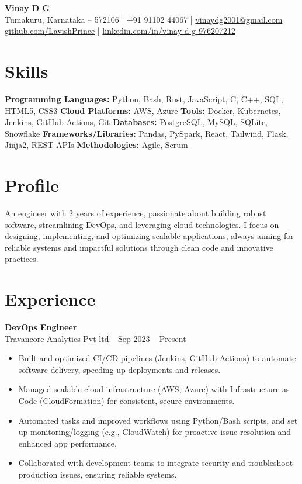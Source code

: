 \documentclass[a4paper,9pt]{article}
\begin{document}
\textbf{\Large Vinay D G} \\Tumakuru, Karnataka – 572106 \quad | \quad +91 91102 44067 \quad | \quad \href{mailto:vinaydg2001@gmail.com}{vinaydg2001@gmail.com} \\\href{https://github.com/LavishPrince}{github.com/LavishPrince} \quad | \quad \href{https://www.linkedin.com/in/vinay-d-g-976207212/}{linkedin.com/in/vinay-d-g-976207212}

\section*{Skills}
\textbf{Programming Languages:} Python, Bash, Rust, JavaScript, C, C++, SQL, HTML5, CSS3
\textbf{Cloud Platforms:} AWS, Azure
\textbf{Tools:} Docker, Kubernetes, Jenkins, GitHub Actions, Git
\textbf{Databases:} PostgreSQL, MySQL, SQLite, Snowflake
\textbf{Frameworks/Libraries:} Pandas, PySpark, React, Tailwind, Flask, Jinja2, REST APIs
\textbf{Methodologies:} Agile, Scrum

\section*{Profile}
An engineer with 2 years of experience, passionate about building robust software, streamlining DevOps, and leveraging cloud technologies. I focus on designing, implementing, and optimizing scalable applications, always aiming for reliable systems and impactful solutions through clean code and innovative practices.

\section*{Experience}
\textbf{DevOps Engineer} \\
Travancore Analytics Pvt ltd. \ \hfill Sep 2023 – Present
\begin{itemize}[leftmargin=0.25in, label=\textbullet]
    \item Built and optimized CI/CD pipelines (Jenkins, GitHub Actions) to automate software delivery, speeding up deployments and releases.
    \item Managed scalable cloud infrastructure (AWS, Azure) with Infrastructure as Code (CloudFormation) for consistent, secure environments.
    \item Automated tasks and improved workflows using Python/Bash scripts, and set up monitoring/logging (e.g., CloudWatch) for proactive issue resolution and enhanced app performance.
    \item Collaborated with development teams to integrate security and troubleshoot production issues, ensuring reliable systems.
\end{itemize}
\end{document}
